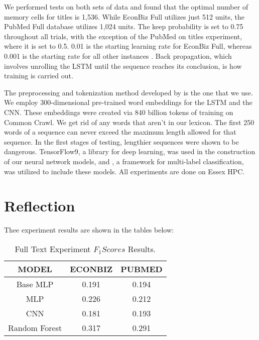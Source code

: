 \documentclass[a4paper]{article}
\begin{document}
We performed tests on both sets of data and found that the optimal number of memory cells for titles is 1,536. While EconBiz Full utilizes just 512 units, the PubMed Full database utilizes 1,024 units. The keep probability is set to 0.75 throughout all trials, with the exception of the PubMed on titles experiment, where it is set to 0.5. 0.01 is the starting learning rate for EconBiz Full, whereas 0.001 is the starting rate for all other instances \cite{scikit-learn}. Back propagation, which involves unrolling the LSTM until the sequence reaches its conclusion, is how training is carried out.

The preprocessing and tokenization method developed by \cite{gibaja2014multi} is the one that we use. We employ 300-dimensional pre-trained word embeddings for the LSTM and the CNN. These embeddings were created via 840 billion tokens of \cite{song2014short} training on Common Crawl. We get rid of any words that aren't in our lexicon. The first 250 words of a sequence can never exceed the maximum length allowed for that sequence. In the first stages of testing, lengthier sequences were shown to be dangerous. TensorFlow9, a library for deep learning, was used in the construction of our neural network models, \cite{katz53} and \cite{yao2014reader}, a framework for multi-label classification, was utilized to include these models. All experiments are done on Essex HPC.

\section{Reflection}
Thee experiment results are shown in the tables below:

\begin{table}[htb]
 \centering \caption{Full Text Experiment $F_1 Scores$ Results.}
\begin{tabular}{ccc}
    \hline
    \textbf{MODEL} & \textbf{ECONBIZ} & \textbf{PUBMED} \\
    \hline
    \hline
    Base MLP & 0.191& 0.194 \\
     \hline
    MLP & 0.226& 0.212 \\
     \hline
    CNN & 0.181& 0.193\\
     \hline
     Random Forest & 0.317& 0.291\\
     \hline
     \end{tabular}
    \end{table}
\end{document}
